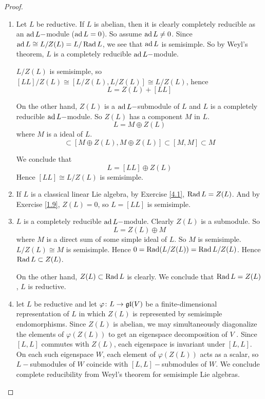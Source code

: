 \begin{proof}
  \begin{enumerate}
    \item Let $L$ be reductive. If $L$ is abelian, then it is clearly completely reducible as an $\operatorname{ad} L-$module ($\operatorname{ad} L = 0$). So assume $\operatorname{ad} L \neq 0$. Since $\operatorname{ad} L \cong L/Z(L) = L/\operatorname{Rad} L$, we see that $\operatorname{ad} L$ is semisimple. So by Weyl's theorem, $L$ is a completely reducible $\operatorname{ad} L-$module.

        $L/Z(L)$ is semisimple, so $[LL]/Z(L) \cong [L/Z(L),L/Z(L)] \cong L/Z(L)$, hence
        \begin{equation*}
          L = Z(L) + [LL]
        \end{equation*}

        On the other hand, $Z(L)$ is a $\operatorname{ad} L-$submodule of $L$ and $L$ is a completely reducible $\operatorname{ad} L-$module. So $Z(L)$ has a component $M$ in $L$.
        \begin{equation*}
          L=M\oplus Z(L)
        \end{equation*}
        where $M$ is a ideal of $L$.
        \begin{equation*}
          [LL] \subset [M \oplus Z(L),M \oplus Z(L)] \subset [M,M] \subset M
        \end{equation*}

        We conclude that
        \begin{equation*}
          L =[LL]\oplus Z(L)
        \end{equation*}
        Hence $[LL] \cong L/Z(L)$ is semisimple.
    \item If $L$ is a classical linear Lie algebra, by Exercise \ref{4.1}, $\operatorname{Rad} L = Z(L)$. And by Exercise \ref{1.9}, $Z(L) = 0$, so $L = [LL]$ is semisimple.
    \item $L$ is a completely reducible $\operatorname{ad} L-$module. Clearly $Z(L)$ is a submodule. So
        \begin{equation*}
          L = Z(L) \oplus M
        \end{equation*}
        where $M$ is a direct sum of some simple ideal of $L$. So $M$ is semisimple. $L/Z(L) \cong M$ is semisimple. Hence $0=\operatorname{Rad}(L/Z(L)) = \operatorname{Rad} L/Z(L)$. Hence $\operatorname{Rad} L \subset Z(L)$.

        On the other hand, $Z(L) \subset \operatorname{Rad} L$ is clearly.
        We conclude that $\operatorname{Rad} L = Z(L)$, $L$ is reductive.
    \item let $L$ be reductive and let $\varphi\colon L \to \mathfrak{g}\mathfrak{l}(V )$ be a finite-dimensional representation of $L$ in which $Z(L)$ is represented by semisimple endomorphisms. Since $Z(L)$ is abelian, we may simultaneously diagonalize the elements of $\varphi(Z(L))$ to get an eigenspace decomposition of $V$ . Since $[L,L]$ commutes with $Z(L)$, each eigenspace is invariant under $[L,L]$. On each such eigenspace $W$, each element of $\varphi(Z(L))$ acts as a scalar, so $L-$submodules of $W$ coincide with $[L,L]-$submodules of $W$. We conclude complete reducibility from Weyl's theorem for semisimple Lie algebras.
  \end{enumerate}
\end{proof}

